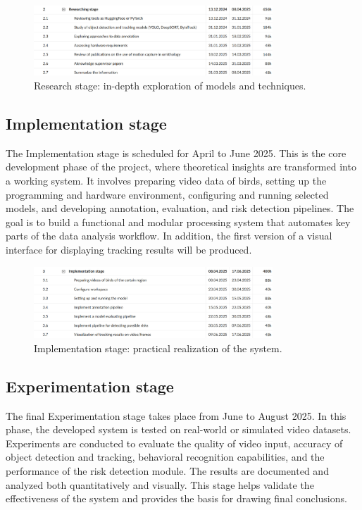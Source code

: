 \begin{figure}[H]
	\centering
	\includegraphics[width=0.8\textwidth]{archivos/figuras/research-stage.jpg}
	\caption{Research stage: in-depth exploration of models and techniques.}
	\label{fig:research-stage}
\end{figure}

\subsection{Implementation stage}

The Implementation stage is scheduled for April to June 2025. This is the core development phase of the project, where theoretical insights are transformed into a working system. It involves preparing video data of birds, setting up the programming and hardware environment, configuring and running selected models, and developing annotation, evaluation, and risk detection pipelines. The goal is to build a functional and modular processing system that automates key parts of the data analysis workflow. In addition, the first version of a visual interface for displaying tracking results will be produced.

\begin{figure}[H]
	\centering
	\includegraphics[width=0.8\textwidth]{archivos/figuras/implementation-stage.jpg}
	\caption{Implementation stage: practical realization of the system.}
	\label{fig:implementation-stage}
\end{figure}

\subsection{Experimentation stage}

The final Experimentation stage takes place from June to August 2025. In this phase, the developed system is tested on real-world or simulated video datasets. Experiments are conducted to evaluate the quality of video input, accuracy of object detection and tracking, behavioral recognition capabilities, and the performance of the risk detection module. The results are documented and analyzed both quantitatively and visually. This stage helps validate the effectiveness of the system and provides the basis for drawing final conclusions.

